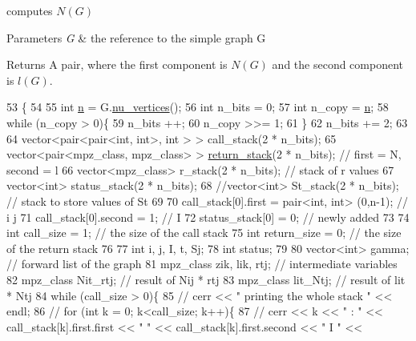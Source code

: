 computes $N(G)$ 


\begin{DoxyParams}{Parameters}
{\em G} & the reference to the simple graph G \\
\hline
\end{DoxyParams}
\begin{DoxyReturn}{Returns}
A pair, where the first component is $N(G)$ and the second component is $l(G)$. 
\end{DoxyReturn}

\begin{DoxyCode}
53 \{
54 
55   \textcolor{keywordtype}{int} \hyperlink{classgraph__encoder_a7fedc9ace19e34abb32f1851c8597591}{n} = G.\hyperlink{classgraph_a70a6e0e4e0a874ab122405abd38f83cd}{nu\_vertices}();
56   \textcolor{keywordtype}{int} n\_bits = 0;
57   \textcolor{keywordtype}{int} n\_copy = \hyperlink{classgraph__encoder_a7fedc9ace19e34abb32f1851c8597591}{n};
58   \textcolor{keywordflow}{while} (n\_copy > 0)\{
59     n\_bits ++;
60     n\_copy >>= 1;
61   \}
62   n\_bits += 2;
63 
64   vector<pair<pair<int, int>, \textcolor{keywordtype}{int} > > call\_stack(2 * n\_bits);
65   vector<pair<mpz\_class, mpz\_class> > \hyperlink{namespacehelper__vars_a6d2100c373830cacd232319a9958652d}{return\_stack}(2 * n\_bits); \textcolor{comment}{// first = N, second = l}
66   vector<mpz\_class> r\_stack(2 * n\_bits); \textcolor{comment}{// stack of r values }
67   vector<int> status\_stack(2 * n\_bits);
68   \textcolor{comment}{//vector<int> St\_stack(2 * n\_bits); // stack to store values of St}
69 
70   call\_stack[0].first = pair<int, int> (0,n-1); \textcolor{comment}{// i j }
71   call\_stack[0].second = 1; \textcolor{comment}{// I}
72   status\_stack[0] = 0; \textcolor{comment}{// newly added}
73 
74   \textcolor{keywordtype}{int} call\_size = 1; \textcolor{comment}{// the size of the call stack}
75   \textcolor{keywordtype}{int} return\_size = 0; \textcolor{comment}{// the size of the return stack}
76 
77   \textcolor{keywordtype}{int} i, j, I, t, Sj;
78   \textcolor{keywordtype}{int} status;
79 
80   vector<int> gamma; \textcolor{comment}{// forward list  of the graph}
81   mpz\_class zik, lik, rtj; \textcolor{comment}{// intermediate variables}
82   mpz\_class Nit\_rtj; \textcolor{comment}{// result of Nij * rtj}
83   mpz\_class lit\_Ntj; \textcolor{comment}{// result of lit * Ntj }
84   \textcolor{keywordflow}{while} (call\_size > 0)\{
85     \textcolor{comment}{// cerr << " printing the whole stack " << endl;}
86     \textcolor{comment}{// for (int k = 0; k<call\_size; k++)\{}
87     \textcolor{comment}{//   cerr << k << " : " << call\_stack[k].first.first << " " << call\_stack[k].first.second << " I " <<
}
\end{DoxyCode}
